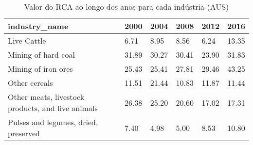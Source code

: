 \begin{table}
\centering
\caption{Valor do RCA ao longo dos anos para cada indústria (AUS)}
\begin{tabular}{p{6cm}p{1.5cm}p{1.5cm}p{1.5cm}p{1.5cm}p{1.5cm}}
\toprule
                                    industry\_name &  2000 &  2004 &  2008 &  2012 &  2016 \\
\midrule
                                      Live Cattle &  6.71 &  8.95 &  8.56 &  6.24 & 13.35 \\
                              Mining of hard coal & 31.89 & 30.27 & 30.41 & 23.90 & 31.83 \\
                              Mining of iron ores & 25.43 & 25.41 & 27.81 & 29.46 & 43.25 \\
                                    Other cereals & 11.51 & 21.44 & 10.83 & 11.87 & 11.44 \\
Other meats, livestock products, and live animals & 26.38 & 25.20 & 20.60 & 17.02 & 17.31 \\
             Pulses and legumes, dried, preserved &  7.40 &  4.98 &  5.00 &  8.53 & 10.80 \\
\bottomrule
\end{tabular}
\end{table}
